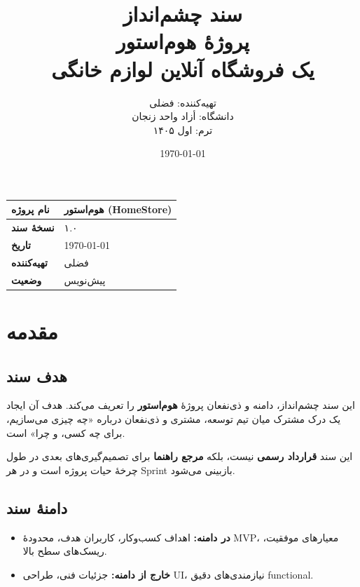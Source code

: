 \documentclass[12pt, a4paper]{article}
\title{
    \vspace{-1cm}
    \textbf{\Huge سند چشم‌انداز}\\[0.3cm]
    \textbf{\LARGE پروژهٔ هوم‌استور}\\[0.5cm]
    \large یک فروشگاه آنلاین لوازم خانگی
}
\author{
    تهیه‌کننده: فضلی\\
    دانشگاه: أزاد واحد زنجان\\
    ترم: اول ۱۴۰۵
}
\date{\today}
\begin{document}
\maketitle
\thispagestyle{empty}

\vspace{1cm}

\begin{center}
\begin{tabular}{|l|l|}
\hline
\textbf{نام پروژه} & هوم‌استور (HomeStore) \\
\hline
\textbf{نسخهٔ سند} & ۱.۰ \\
\hline
\textbf{تاریخ} & \today \\
\hline
\textbf{تهیه‌کننده} & فضلی \\
\hline
\textbf{وضعیت} & پیش‌نویس \\
\hline
\end{tabular}
\end{center}

\newpage
\tableofcontents
\newpage

\section{مقدمه}

\subsection{هدف سند}
این سند چشم‌انداز، دامنه و ذی‌نفعان پروژهٔ \textbf{هوم‌استور} را تعریف می‌کند.
هدف آن ایجاد یک درک مشترک میان تیم توسعه، مشتری و ذی‌نفعان درباره
«چه چیزی می‌سازیم، برای چه کسی، و چرا» است.

این سند \textbf{قرارداد رسمی} نیست، بلکه \textbf{مرجع راهنما} برای تصمیم‌گیری‌های
بعدی در طول چرخهٔ حیات پروژه است و در هر Sprint بازبینی می‌شود.

\subsection{دامنهٔ سند}
\begin{itemize}
    \item \textbf{در دامنه:} اهداف کسب‌وکار، کاربران هدف، محدودهٔ MVP، معیارهای موفقیت، ریسک‌های سطح بالا.
    \item \textbf{خارج از دامنه:} جزئیات فنی، طراحی UI، نیازمندی‌های دقیق functional.
\end{itemize}
\end{document}
